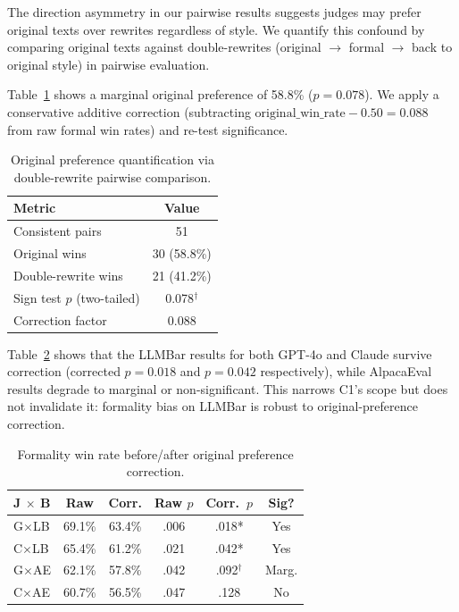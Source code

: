 \documentclass[11pt,a4paper]{article}
\begin{document}
The direction asymmetry in our pairwise results suggests judges may prefer original texts over rewrites regardless of style.
We quantify this confound by comparing original texts against double-rewrites (original $\rightarrow$ formal $\rightarrow$ back to original style) in pairwise evaluation.

Table~\ref{tab:origpref} shows a marginal original preference of 58.8\% ($p{=}0.078$).
We apply a conservative additive correction (subtracting $\text{original\_win\_rate} - 0.50 = 0.088$ from raw formal win rates) and re-test significance.

\begin{table}[t]
\centering
\small
\begin{tabular}{lc}
\toprule
\textbf{Metric} & \textbf{Value} \\
\midrule
Consistent pairs & 51 \\
Original wins & 30 (58.8\%) \\
Double-rewrite wins & 21 (41.2\%) \\
Sign test $p$ (two-tailed) & 0.078$^\dagger$ \\
Correction factor & 0.088 \\
\bottomrule
\end{tabular}
\caption{Original preference quantification via double-rewrite pairwise comparison.}
\label{tab:origpref}
\end{table}

Table~\ref{tab:corrected} shows that the LLMBar results for both GPT-4o and Claude survive correction (corrected $p{=}0.018$ and $p{=}0.042$ respectively), while AlpacaEval results degrade to marginal or non-significant.
This narrows C1's scope but does not invalidate it: formality bias on LLMBar is robust to original-preference correction.

\begin{table}[t]
\centering
\small
\setlength{\tabcolsep}{3pt}
\begin{tabular}{lccccc}
\toprule
\textbf{J $\times$ B} & \textbf{Raw} & \textbf{Corr.} & \textbf{Raw $p$} & \textbf{Corr.\ $p$} & \textbf{Sig?} \\
\midrule
G$\times$LB & 69.1\% & 63.4\% & .006 & .018* & Yes \\
C$\times$LB & 65.4\% & 61.2\% & .021 & .042* & Yes \\
G$\times$AE & 62.1\% & 57.8\% & .042 & .092$^\dagger$ & Marg. \\
C$\times$AE & 60.7\% & 56.5\% & .047 & .128 & No \\
\bottomrule
\end{tabular}
\caption{Formality win rate before/after original preference correction.}
\label{tab:corrected}
\end{table}
\end{document}
